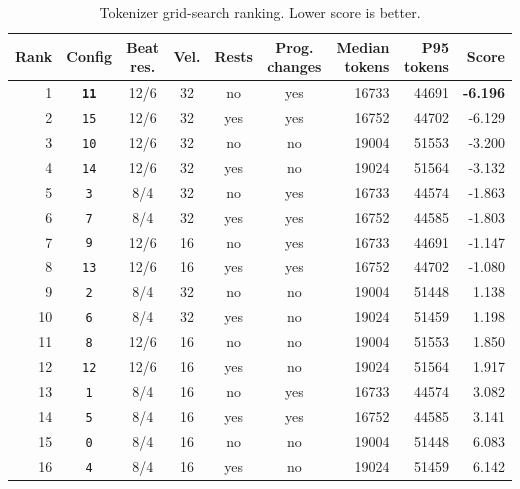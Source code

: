 \begin{table}[htbp]
	\centering
	\scriptsize
	\begin{tabular}{rcccccrrr}
		\toprule
		Rank & Config               & Beat res. & Vel. & Rests & Prog. changes & Median tokens & P95 tokens & Score           \\
		\midrule
		1    & \texttt{\textbf{11}} & 12/6      & 32   & no    & yes           & 16733         & 44691      & \textbf{-6.196} \\
		2    & \verb|15|            & 12/6      & 32   & yes   & yes           & 16752         & 44702      & -6.129          \\
		3    & \verb|10|            & 12/6      & 32   & no    & no            & 19004         & 51553      & -3.200          \\
		4    & \verb|14|            & 12/6      & 32   & yes   & no            & 19024         & 51564      & -3.132          \\
		5    & \verb|3|             & 8/4       & 32   & no    & yes           & 16733         & 44574      & -1.863          \\
		6    & \verb|7|             & 8/4       & 32   & yes   & yes           & 16752         & 44585      & -1.803          \\
		7    & \verb|9|             & 12/6      & 16   & no    & yes           & 16733         & 44691      & -1.147          \\
		8    & \verb|13|            & 12/6      & 16   & yes   & yes           & 16752         & 44702      & -1.080          \\
		9    & \verb|2|             & 8/4       & 32   & no    & no            & 19004         & 51448      & 1.138           \\
		10   & \verb|6|             & 8/4       & 32   & yes   & no            & 19024         & 51459      & 1.198           \\
		11   & \verb|8|             & 12/6      & 16   & no    & no            & 19004         & 51553      & 1.850           \\
		12   & \verb|12|            & 12/6      & 16   & yes   & no            & 19024         & 51564      & 1.917           \\
		13   & \verb|1|             & 8/4       & 16   & no    & yes           & 16733         & 44574      & 3.082           \\
		14   & \verb|5|             & 8/4       & 16   & yes   & yes           & 16752         & 44585      & 3.141           \\
		15   & \verb|0|             & 8/4       & 16   & no    & no            & 19004         & 51448      & 6.083           \\
		16   & \verb|4|             & 8/4       & 16   & yes   & no            & 19024         & 51459      & 6.142           \\
		\bottomrule
	\end{tabular}
	\caption{Tokenizer grid-search ranking. Lower score is better.}
	\label{tab:tokenizer-autotune}

\end{table}

